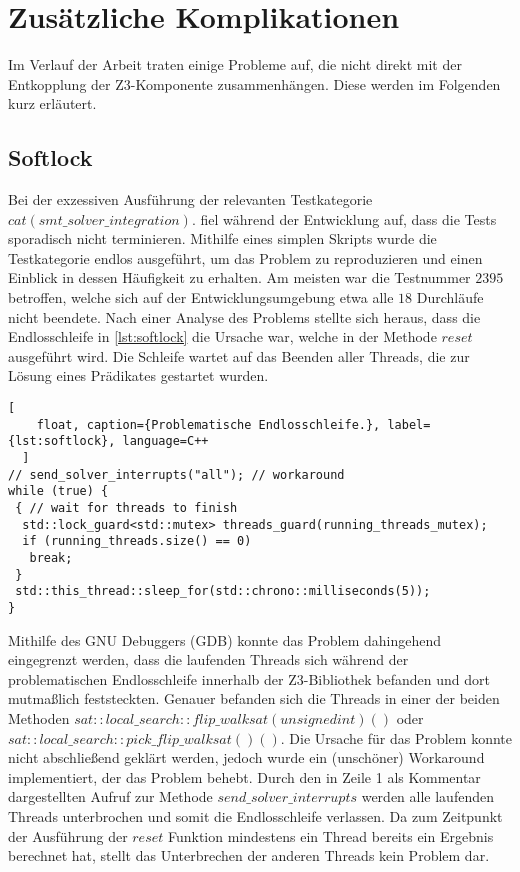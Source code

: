 

\section{Zusätzliche Komplikationen}

Im Verlauf der Arbeit traten einige Probleme auf, die nicht direkt mit der Entkopplung der Z3-Komponente zusammenhängen. Diese werden im Folgenden kurz erläutert.

\subsection{Softlock}
\label{subsec:softlock}

Bei der exzessiven Ausführung der relevanten Testkategorie $cat(smt\_solver\_integration).$ fiel während der Entwicklung auf,
dass die Tests sporadisch nicht terminieren.
Mithilfe eines simplen Skripts wurde die Testkategorie endlos ausgeführt, um das Problem zu reproduzieren und einen Einblick in dessen Häufigkeit zu erhalten.
Am meisten war die Testnummer $2395$ betroffen, welche sich auf der Entwicklungsumgebung etwa alle $18$ Durchläufe nicht beendete. 
Nach einer Analyse des Problems stellte sich heraus, dass die Endlosschleife in \cref{lst:softlock} die Ursache war, welche in der Methode $reset$ ausgeführt wird.
Die Schleife wartet auf das Beenden aller Threads, die zur Lösung eines Prädikates gestartet wurden.

\begin{lstlisting}[
    float, caption={Problematische Endlosschleife.}, label={lst:softlock}, language=C++
  ]
// send_solver_interrupts("all"); // workaround
while (true) {
 { // wait for threads to finish
  std::lock_guard<std::mutex> threads_guard(running_threads_mutex);
  if (running_threads.size() == 0)
   break;
 }
 std::this_thread::sleep_for(std::chrono::milliseconds(5));
}
\end{lstlisting}

Mithilfe des GNU Debuggers (GDB) \cite{stallman1988debugging} konnte das Problem dahingehend eingegrenzt werden,
dass die laufenden Threads sich während der problematischen Endlosschleife innerhalb der Z3-Bibliothek befanden
und dort mutmaßlich feststeckten.
Genauer befanden sich die Threads in einer der beiden Methoden $sat::local\_search::flip\_walksat(unsigned int) ()$ oder $sat::local\_search::pick\_flip\_walksat() ()$.
Die Ursache für das Problem konnte nicht abschließend geklärt werden, jedoch wurde ein (unschöner) Workaround implementiert, der das Problem behebt.
Durch den in Zeile 1 als Kommentar dargestellten Aufruf zur Methode $send\_solver\_interrupts$ werden alle laufenden Threads unterbrochen und somit die Endlosschleife verlassen.
Da zum Zeitpunkt der Ausführung der $reset$ Funktion mindestens ein Thread bereits ein Ergebnis berechnet hat, stellt das Unterbrechen der anderen Threads kein Problem dar.

